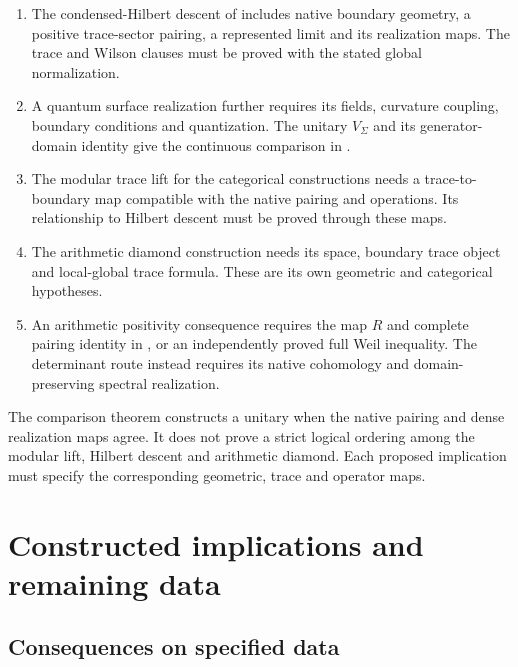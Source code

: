 \begin{enumerate}
\item The condensed-Hilbert descent of
 includes native boundary
geometry, a positive trace-sector pairing, a represented limit and
its realization maps. The trace and Wilson clauses must be proved
with the stated global normalization.
\item A quantum surface realization further requires its fields,
curvature coupling, boundary conditions and quantization. The
unitary \(V_\Sigma\) and its generator-domain identity give the
continuous comparison in
.
\item The modular trace lift for the categorical constructions needs
a trace-to-boundary map compatible with the native pairing and
operations. Its relationship to Hilbert descent must be proved
through these maps.
\item The arithmetic diamond construction needs its space, boundary
trace object and local-global trace formula. These are its own
geometric and categorical hypotheses.
\item An arithmetic positivity consequence requires the map \(R\)
and complete pairing identity in
, or an independently proved
full Weil inequality. The determinant route instead requires its
native cohomology and domain-preserving spectral realization.
\end{enumerate}

\begin{remark}
\label{v4-arith:w10-a:rem:partial-order}
The comparison theorem constructs a unitary when the native pairing
and dense realization maps agree. It does not prove a strict logical
ordering among the modular lift, Hilbert descent and arithmetic
diamond. Each proposed implication must specify the corresponding
geometric, trace and operator maps.
\end{remark}
\section{Constructed implications and remaining data}
\label{v4-arith:w10-a:what-closes}

\subsection*{Consequences on specified data}

